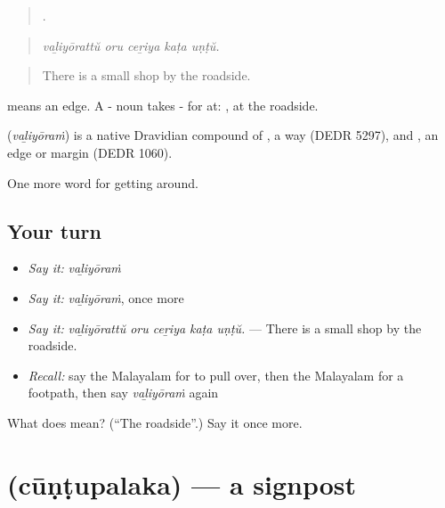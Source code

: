 \begin{quote}
    .
\end{quote}

\begin{quote}
\emph{vaḻiyōrattŭ oru ceṟiya kaṭa uṇṭŭ.}
\end{quote}

\begin{quote}
There is a small shop by the roadside.
\end{quote}

 means an edge. A - noun takes - for at: , at the roadside.

\begin{cousinweb}
\textbf{} (\emph{vaḻiyōraṁ}) is a native Dravidian compound of , a way (DEDR 5297), and , an edge or margin (DEDR 1060).
\end{cousinweb}

\begin{grammarlens}[title={What you've built}]
One more word for getting around.
\end{grammarlens}

\subsection*{Your turn}
\begin{itemize}
\raggedright
  \item \emph{Say it:} \emph{vaḻiyōraṁ}
  \item \emph{Say it:} \emph{vaḻiyōraṁ}, once more
  \item \emph{Say it:} \emph{vaḻiyōrattŭ oru ceṟiya kaṭa uṇṭŭ.} — There is a small shop by the roadside.
  \item \emph{Recall:} say the Malayalam for to pull over, then the Malayalam for a footpath, then say \emph{vaḻiyōraṁ} again
\end{itemize}

\begin{tcolorbox}[breakable,colback=teal!4,colframe=teal!35!black,title={Before you move on}]
What does  mean? (\textquotedblleft{}The roadside\textquotedblright{}.) Say it once more.
\end{tcolorbox}
\section[\texorpdfstring{\ml{ചൂണ്ടുപലക} (cūṇṭupalaka)}{ചൂണ്ടുപലക (cūṇṭupalaka)}]{ (cūṇṭupalaka) — a signpost}


